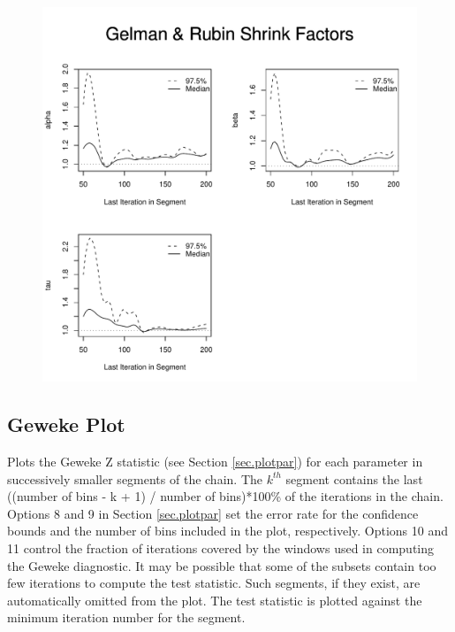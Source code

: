 \documentclass[12pt,letterpaper]{report}
\begin{document}
\begin{figure}[h]
\centering
\includegraphics[keepaspectratio,width=5in]{gandr.pdf}
\end{figure}

\pagebreak

\subsection{Geweke Plot}
\noindent
Plots the Geweke Z statistic (see Section \ref{sec.plotpar}) for each
parameter in successively smaller segments of the chain. The $k^{th}$ segment
contains the last ((number of bins - k + 1) / number of bins)*100\% of the
iterations in the chain. Options 8 and 9 in Section \ref{sec.plotpar} set
the error rate for the confidence bounds and the number of bins included in the
plot, respectively. Options 10 and 11 control the fraction of iterations covered
by the windows used in computing the Geweke diagnostic. It may be possible that
some of the subsets contain too few iterations to compute the test statistic.
Such segments, if they exist, are automatically omitted from the plot. The test
statistic is plotted against the minimum iteration number for the segment.
\end{document}

